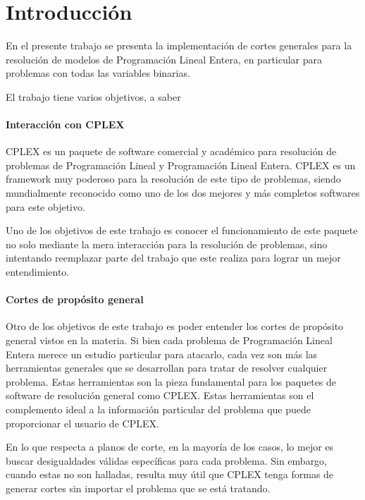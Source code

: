 \section{Introducci\'on}

En el presente trabajo se presenta la implementaci\'on de cortes generales para la resoluci\'on de modelos de Programaci\'on Lineal Entera, en particular para problemas con todas las variables binarias.

El trabajo tiene varios objetivos, a saber

\paragraph{Interacci\'on con CPLEX} 
\medskip
CPLEX es un paquete de software comercial y acad\'emico para resoluci\'on de problemas de Programaci\'on Lineal y Programaci\'on Lineal Entera. CPLEX es un framework muy poderoso para la resoluci\'on de este tipo de problemas, siendo mundialmente reconocido como uno de los dos mejores y m\'as completos softwares para este objetivo.

Uno de los objetivos de este trabajo es conocer el funcionamiento de este paquete no solo mediante la mera interacci\'on para la resoluci\'on de problemas, sino intentando reemplazar parte del trabajo que este realiza para lograr un mejor entendimiento.



\paragraph{Cortes de prop\'osito general} 
\medskip
Otro de los objetivos de este trabajo es poder entender los cortes de prop\'osito general vistos en la materia. Si bien cada problema de Programaci\'on Lineal Entera merece un estudio particular para atacarlo, cada vez son m\'as las herramientas generales que se desarrollan para tratar de resolver cualquier problema. Estas herramientas son la pieza fundamental para los paquetes de software de resoluci\'on general como CPLEX. Estas herramientas son el complemento ideal a la informaci\'on particular del problema que puede proporcionar el usuario de CPLEX.

En lo que respecta a planos de corte, en la mayor\'ia de los casos, lo mejor es buscar desigualdades v\'alidas espec\'ificas para cada problema. Sin embargo, cuando estas no son halladas, resulta muy \'util que CPLEX tenga formas de generar cortes sin importar el problema que se est\'a tratando. 

